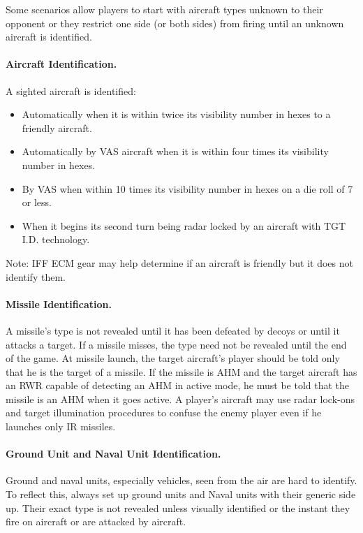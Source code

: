 Some scenarios allow players to start with aircraft types unknown to their opponent or they restrict one side (or both sides) from firing until an unknown aircraft is identified.

\paragraph{Aircraft Identification.} A sighted aircraft is identified:

\begin{itemize}

    \item Automatically when it is within twice its visibility number in hexes to a friendly aircraft.

    \item Automatically by VAS aircraft when it is within four times its visibility number in hexes.

    \item By VAS when within 10 times its visibility number in hexes on a die roll of 7 or less.

    \item When it begins its second turn being radar locked by an aircraft with TGT I.D. technology.

\end{itemize}

Note: IFF ECM gear may help determine if an aircraft is friendly but it does not identify them.

\paragraph{Missile Identification.} A missile's type is not revealed until it has been defeated by decoys or until it attacks a target. If a missile misses, the type need not be revealed until the end of the game. At missile launch, the target aircraft's player should be told only that he is the target of a missile. If the missile is AHM and the target aircraft has an RWR capable of detecting an AHM in active mode, he must be told that the missile is an AHM when it goes active. A player's aircraft may use radar lock-ons and target illumination procedures to confuse the enemy player even if he launches only IR missiles.

\paragraph{Ground Unit and Naval Unit Identification.} Ground and naval units, especially vehicles, seen from the air are hard to identify. To reflect this, always set up ground units and Naval units with their generic side up. Their exact type is not revealed unless visually identified or the instant they fire on aircraft or are attacked by aircraft.

